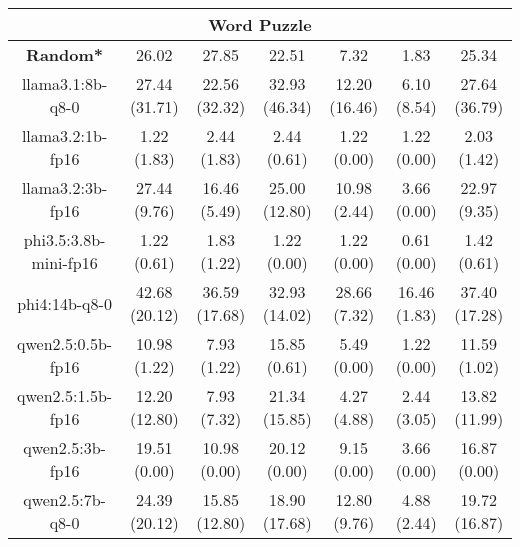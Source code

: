 \begin{table}[hbp]
{\begin{tabular}{ccccccc}
\hline
\multicolumn{7}{c}{Word Puzzle} \\ \hline
\multicolumn{1}{c|}{\textbf{Random*}} & 26.02 & 27.85 & \multicolumn{1}{c|}{22.51} & 7.32 & \multicolumn{1}{c|}{1.83} & 25.34 \\ \hline

        \multicolumn{1}{c|}{llama3.1:8b-q8-0} & 27.44 (31.71) & 22.56 (32.32) & \multicolumn{1}{c|}{32.93 (46.34)} & 12.20 (16.46) & \multicolumn{1}{c|}{6.10 (8.54)} & 27.64 (36.79) \\
        

        \multicolumn{1}{c|}{llama3.2:1b-fp16} & 1.22 (1.83) & 2.44 (1.83) & \multicolumn{1}{c|}{2.44 (0.61)} & 1.22 (0.00) & \multicolumn{1}{c|}{1.22 (0.00)} & 2.03 (1.42) \\
        

        \multicolumn{1}{c|}{llama3.2:3b-fp16} & 27.44 (9.76) & 16.46 (5.49) & \multicolumn{1}{c|}{25.00 (12.80)} & 10.98 (2.44) & \multicolumn{1}{c|}{3.66 (0.00)} & 22.97 (9.35) \\
        

        \multicolumn{1}{c|}{phi3.5:3.8b-mini-fp16} & 1.22 (0.61) & 1.83 (1.22) & \multicolumn{1}{c|}{1.22 (0.00)} & 1.22 (0.00) & \multicolumn{1}{c|}{0.61 (0.00)} & 1.42 (0.61) \\
        

        \multicolumn{1}{c|}{phi4:14b-q8-0} & 42.68 (20.12) & 36.59 (17.68) & \multicolumn{1}{c|}{32.93 (14.02)} & 28.66 (7.32) & \multicolumn{1}{c|}{16.46 (1.83)} & 37.40 (17.28) \\
        

        \multicolumn{1}{c|}{qwen2.5:0.5b-fp16} & 10.98 (1.22) & 7.93 (1.22) & \multicolumn{1}{c|}{15.85 (0.61)} & 5.49 (0.00) & \multicolumn{1}{c|}{1.22 (0.00)} & 11.59 (1.02) \\
        

        \multicolumn{1}{c|}{qwen2.5:1.5b-fp16} & 12.20 (12.80) & 7.93 (7.32) & \multicolumn{1}{c|}{21.34 (15.85)} & 4.27 (4.88) & \multicolumn{1}{c|}{2.44 (3.05)} & 13.82 (11.99) \\
        

        \multicolumn{1}{c|}{qwen2.5:3b-fp16} & 19.51 (0.00) & 10.98 (0.00) & \multicolumn{1}{c|}{20.12 (0.00)} & 9.15 (0.00) & \multicolumn{1}{c|}{3.66 (0.00)} & 16.87 (0.00) \\
        

        \multicolumn{1}{c|}{qwen2.5:7b-q8-0} & 24.39 (20.12) & 15.85 (12.80) & \multicolumn{1}{c|}{18.90 (17.68)} & 12.80 (9.76) & \multicolumn{1}{c|}{4.88 (2.44)} & 19.72 (16.87) \\
        


\end{tabular}}
\end{table}
